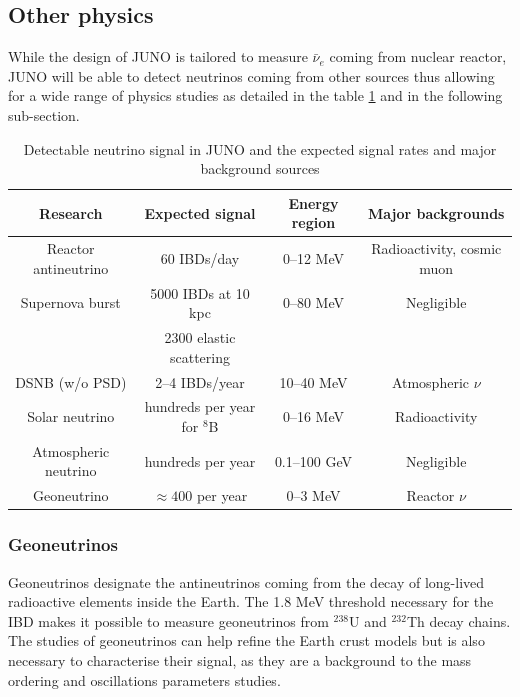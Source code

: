 \subsection{Other physics}

While the design of JUNO is tailored to measure $\bar{\nu}_e$ coming from nuclear reactor, JUNO will be able to detect neutrinos coming from other sources thus allowing for a wide range of physics studies as detailed in the table \ref{tab:signal} and in the following sub-section.

\begin{table}[ht]
\begin{center}
  \begin{tabular}{|c|c|c|c|}
    \hline Research & Expected signal & Energy region & Major backgrounds \\
    \hline Reactor antineutrino & 60 IBDs/day & 0–12 MeV  & Radioactivity, cosmic muon \\
    Supernova burst & 5000 IBDs at 10 kpc & 0–80 MeV & Negligible \\
                    & 2300 elastic scattering  & &  \\
    DSNB (w/o PSD) & 2–4 IBDs/year & 10–40 MeV & Atmospheric $\nu$ \\
    Solar neutrino & hundreds per year for $^8$B & 0–16 MeV & Radioactivity \\
    Atmospheric neutrino & hundreds per year & 0.1–100 GeV  & Negligible \\
    Geoneutrino &  $\approx 400$ per year & 0–3 MeV & Reactor $\nu$ \\
    \hline
  \end{tabular}
  \caption{Detectable neutrino signal in JUNO and the expected signal rates and major background sources}
  \label{tab:signal}
\end{center}
\end{table}


\subsubsection{Geoneutrinos}

Geoneutrinos designate the antineutrinos coming from the decay of long-lived radioactive elements inside the Earth. The 1.8 MeV threshold necessary for the IBD makes it possible to measure geoneutrinos from $^{238}$U and $^{232}$Th decay chains. The studies of geoneutrinos can help refine the Earth crust models but is also necessary to characterise their signal, as they are a background to the mass ordering and oscillations parameters studies.

